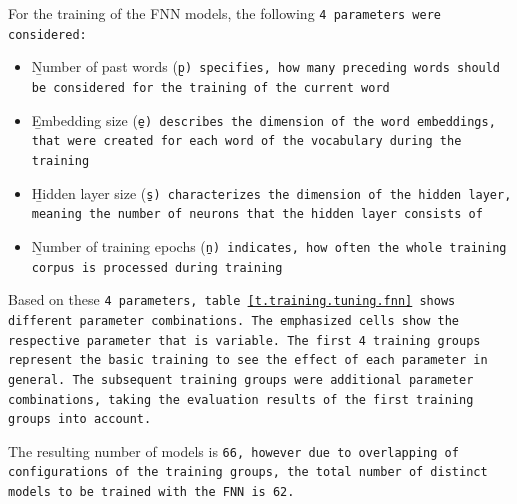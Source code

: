 For the training of the FNN models, the following \tt{4} parameters were considered:

\begin{itemize}
	\item \b{Number of past words} (\tt{\b{p}}) specifies, how many preceding words should be considered for the training of the current word
	\item \b{Embedding size} (\tt{\b{e}}) describes the dimension of the word embeddings, that were created for each word of the vocabulary during the training
	\item \b{Hidden layer size} (\tt{\b{s}}) characterizes the dimension of the hidden layer, meaning the number of neurons that the hidden layer consists of
	\item \b{Number of training epochs} (\tt{\b{n}}) indicates, how often the whole training corpus is processed during training
\end{itemize}

Based on these \tt{4} parameters, table \ref{t.training.tuning.fnn} shows different parameter combinations. The emphasized cells show the respective parameter that is variable. The first \tt{4} training groups represent the basic training to see the effect of each parameter in general. The subsequent training groups were additional parameter combinations, taking the evaluation results of the first training groups into account.

The resulting number of models is \tt{66}, however due to overlapping of configurations of the training groups, the total number of distinct models to be trained with the FNN is \tt{62}.


